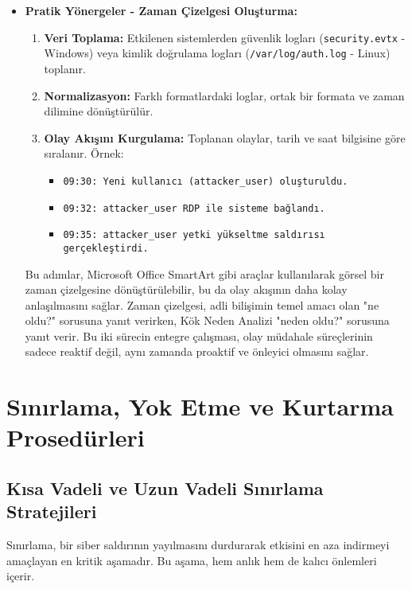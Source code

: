 \begin{itemize}
    \item \textbf{Pratik Yönergeler - Zaman Çizelgesi Oluşturma:}
    \begin{enumerate}
        \item \textbf{Veri Toplama:} Etkilenen sistemlerden güvenlik logları (\texttt{security.evtx} - Windows) veya kimlik doğrulama logları (\texttt{/var/log/auth.log} - Linux) toplanır.
        \item \textbf{Normalizasyon:} Farklı formatlardaki loglar, ortak bir formata ve zaman dilimine dönüştürülür.
        \item \textbf{Olay Akışını Kurgulama:} Toplanan olaylar, tarih ve saat bilgisine göre sıralanır. Örnek:
        \begin{itemize}
            \item \texttt{09:30: Yeni kullanıcı (attacker\_user) oluşturuldu.}
            \item \texttt{09:32: attacker\_user RDP ile sisteme bağlandı.}
            \item \texttt{09:35: attacker\_user yetki yükseltme saldırısı gerçekleştirdi.}
        \end{itemize}
    \end{enumerate}
    Bu adımlar, Microsoft Office SmartArt gibi araçlar kullanılarak görsel bir zaman çizelgesine dönüştürülebilir, bu da olay akışının daha kolay anlaşılmasını sağlar. Zaman çizelgesi, adli bilişimin temel amacı olan "ne oldu?" sorusuna yanıt verirken, Kök Neden Analizi "neden oldu?" sorusuna yanıt verir. Bu iki sürecin entegre çalışması, olay müdahale süreçlerinin sadece reaktif değil, aynı zamanda proaktif ve önleyici olmasını sağlar.
\end{itemize}

\section{Sınırlama, Yok Etme ve Kurtarma Prosedürleri}

\subsection{Kısa Vadeli ve Uzun Vadeli Sınırlama Stratejileri}

Sınırlama, bir siber saldırının yayılmasını durdurarak etkisini en aza indirmeyi amaçlayan en kritik aşamadır. Bu aşama, hem anlık hem de kalıcı önlemleri içerir.

